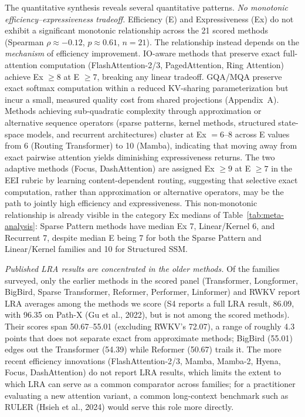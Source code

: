 \documentclass[10pt,twocolumn]{article}
\begin{document}
The quantitative synthesis reveals several quantitative patterns. \textit{No monotonic efficiency--expressiveness tradeoff.} Efficiency (E) and Expressiveness (Ex) do not exhibit a significant monotonic relationship across the 21 scored methods (Spearman $\rho \approx -0.12$, $p \approx 0.61$, $n = 21$). The relationship instead depends on the \emph{mechanism} of efficiency improvement. IO-aware methods that preserve exact full-attention computation (FlashAttention-2/3, PagedAttention, Ring Attention) achieve Ex $\ge 8$ at E $\ge 7$, breaking any linear tradeoff. GQA/MQA preserve exact softmax computation within a reduced KV-sharing parameterization but incur a small, measured quality cost from shared projections (Appendix~A). Methods achieving sub-quadratic complexity through approximation or alternative sequence operators (sparse patterns, kernel methods, structured state-space models, and recurrent architectures) cluster at Ex $= 6$--$8$ across E values from 6 (Routing Transformer) to 10 (Mamba), indicating that moving away from exact pairwise attention yields diminishing expressiveness returns. The two adaptive methods (Focus, DashAttention) are assigned Ex $\ge 9$ at E $\ge 7$ in the EEI rubric by learning content-dependent routing, suggesting that selective exact computation, rather than approximation or alternative operators, may be the path to jointly high efficiency and expressiveness. This non-monotonic relationship is already visible in the category Ex medians of Table~\ref{tab:meta-analysis}: Sparse Pattern methods have median Ex 7, Linear/Kernel 6, and Recurrent 7, despite median E being 7 for both the Sparse Pattern and Linear/Kernel families and 10 for Structured SSM.

\textit{Published LRA results are concentrated in the older methods.} Of the families surveyed, only the earlier methods in the scored panel (Transformer, Longformer, BigBird, Sparse Transformer, Reformer, Performer, Linformer) and RWKV report LRA averages among the methods we score (S4 reports a full LRA result, 86.09, with 96.35 on Path-X (Gu et al., 2022), but is not among the scored methods). Their scores span 50.67--55.01 (excluding RWKV's 72.07), a range of roughly 4.3 points that does not separate exact from approximate methods; BigBird (55.01) edges out the Transformer (54.39) while Reformer (50.67) trails it. The more recent efficiency innovations (FlashAttention-2/3, Mamba, Mamba-2, Hyena, Focus, DashAttention) do not report LRA results, which limits the extent to which LRA can serve as a common comparator across families; for a practitioner evaluating a new attention variant, a common long-context benchmark such as RULER (Hsieh et al., 2024) would serve this role more directly.
\end{document}
